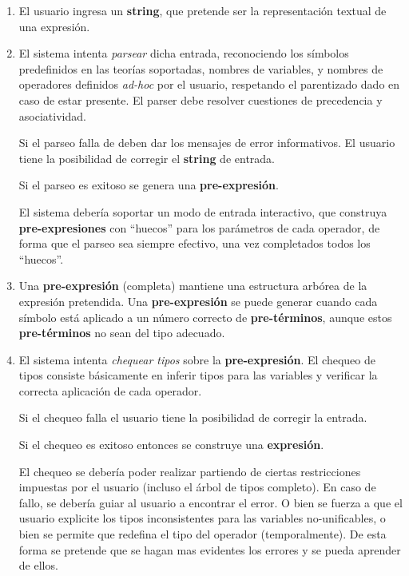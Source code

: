 \documentclass{article}
\begin{document}
\label{sec:usecase}
\begin{enumerate}
\item El usuario ingresa un \textbf{string}, que pretende ser la representación
  textual de una expresión. 
  
\item El sistema intenta \emph{parsear} dicha entrada, reconociendo los símbolos 
  predefinidos en las teorías soportadas, nombres de variables, y nombres
  de operadores definidos \emph{ad-hoc} por el usuario, respetando
  el parentizado dado en caso de estar presente. El parser debe resolver
  cuestiones de precedencia y asociatividad. 
  
  Si el parseo falla de deben dar los mensajes de error informativos. El usuario
  tiene la posibilidad de corregir el \textbf{string} de entrada.
  
  Si el parseo es exitoso se genera una \textbf{pre-expresión}.
  
  El sistema debería soportar un modo de entrada interactivo, que construya
  \textbf{pre-expresiones} con ``huecos'' para los parámetros de cada operador, 
  de forma que el parseo sea siempre efectivo, una vez completados todos los
  ``huecos''.
  
\item Una \textbf{pre-expresión} (completa) mantiene una estructura arbórea de la 
  expresión pretendida. Una \textbf{pre-expresión} se puede generar cuando
  cada símbolo está aplicado a un número correcto de \textbf{pre-términos},
  aunque estos \textbf{pre-términos} no sean del tipo adecuado.
  
\item El sistema intenta \emph{chequear tipos} sobre la \textbf{pre-expresión}.
  El chequeo de tipos consiste básicamente en inferir tipos para las variables
  y verificar la correcta aplicación de cada operador.
  
  Si el chequeo falla el usuario tiene la posibilidad de corregir la entrada.
    
  Si el chequeo es exitoso entonces se construye una \textbf{expresión}.
  
  El chequeo se debería poder realizar partiendo de ciertas restricciones
  impuestas por el usuario (incluso el árbol de tipos completo). 
  En caso de fallo, se debería guiar al usuario a encontrar el error. O bien
  se fuerza a que el usuario explicite los tipos inconsistentes para las
  variables no-unificables, o bien se permite que redefina el tipo del operador
  (temporalmente). De esta forma se pretende que se hagan mas evidentes
  los errores y se pueda aprender de ellos.
    

\end{enumerate}
\end{document}
